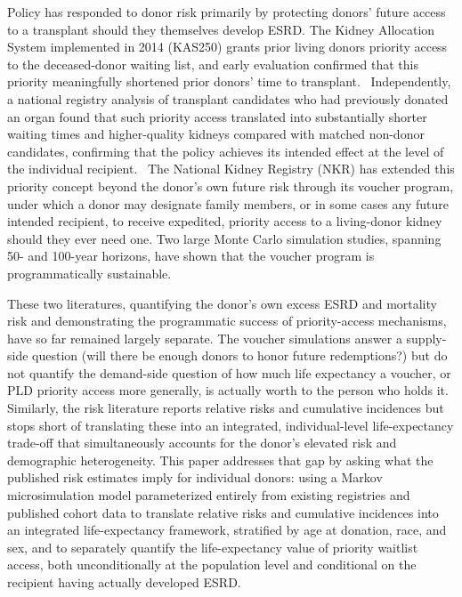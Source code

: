Policy has responded to donor risk primarily by protecting donors' future access to a transplant should they themselves develop ESRD. The Kidney Allocation System implemented in 2014 (KAS250) grants prior living donors priority access to the deceased-donor waiting list, and early evaluation confirmed that this priority meaningfully shortened prior donors' time to transplant.~\cite{wainright_impact_2017} Independently, a national registry analysis of transplant candidates who had previously donated an organ found that such priority access translated into substantially shorter waiting times and higher-quality kidneys compared with matched non-donor candidates, confirming that the policy achieves its intended effect at the level of the individual recipient.~\cite{reese_kidney_2015} The National Kidney Registry (NKR) has extended this priority concept beyond the donor's own future risk through its voucher program, under which a donor may designate family members, or in some cases any future intended recipient, to receive expedited, priority access to a living-donor kidney should they ever need one. Two large Monte Carlo simulation studies, spanning 50- and 100-year horizons, have shown that the voucher program is programmatically sustainable.~\cite{cooper_ensuring_2021, cooper_100-year_2026}

These two literatures, quantifying the donor's own excess ESRD and mortality risk and demonstrating the programmatic success of priority-access mechanisms, have so far remained largely separate. The voucher simulations answer a supply-side question (will there be enough donors to honor future redemptions?) but do not quantify the demand-side question of how much life expectancy a voucher, or PLD priority access more generally, is actually worth to the person who holds it. Similarly, the risk literature reports relative risks and cumulative incidences but stops short of translating these into an integrated, individual-level life-expectancy trade-off that simultaneously accounts for the donor's elevated risk and demographic heterogeneity. This paper addresses that gap by asking what the published risk estimates imply for individual donors: using a Markov microsimulation model parameterized entirely from existing registries and published cohort data to translate relative risks and cumulative incidences into an integrated life-expectancy framework, stratified by age at donation, race, and sex, and to separately quantify the life-expectancy value of priority waitlist access, both unconditionally at the population level and conditional on the recipient having actually developed ESRD.